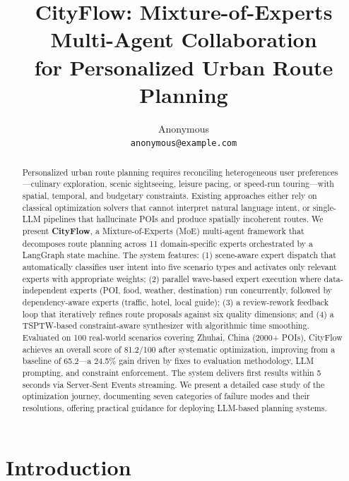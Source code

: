\documentclass[11pt]{article}
\title{\textbf{CityFlow}: Mixture-of-Experts Multi-Agent Collaboration\\for Personalized Urban Route Planning}
\author{%
  Anonymous\\
  \texttt{anonymous@example.com}
}
\begin{document}
\maketitle

\begin{abstract}

Personalized urban route planning requires reconciling heterogeneous user preferences---culinary exploration, scenic sightseeing, leisure pacing, or speed-run touring---with spatial, temporal, and budgetary constraints. Existing approaches either rely on classical optimization solvers that cannot interpret natural language intent, or single-LLM pipelines that hallucinate POIs and produce spatially incoherent routes. We present \textbf{CityFlow}, a Mixture-of-Experts (MoE) multi-agent framework that decomposes route planning across 11 domain-specific experts orchestrated by a LangGraph state machine. The system features: (1) scene-aware expert dispatch that automatically classifies user intent into five scenario types and activates only relevant experts with appropriate weights; (2) parallel wave-based expert execution where data-independent experts (POI, food, weather, destination) run concurrently, followed by dependency-aware experts (traffic, hotel, local guide); (3) a review-rework feedback loop that iteratively refines route proposals against six quality dimensions; and (4) a TSPTW-based constraint-aware synthesizer with algorithmic time smoothing. Evaluated on 100 real-world scenarios covering Zhuhai, China (2000+ POIs), CityFlow achieves an overall score of 81.2/100 after systematic optimization, improving from a baseline of 65.2---a 24.5\% gain driven by fixes to evaluation methodology, LLM prompting, and constraint enforcement. The system delivers first results within 5 seconds via Server-Sent Events streaming. We present a detailed case study of the optimization journey, documenting seven categories of failure modes and their resolutions, offering practical guidance for deploying LLM-based planning systems.

\end{abstract}

\section{Introduction}
\end{document}
